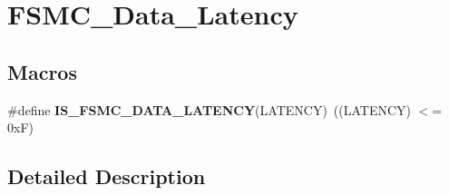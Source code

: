 \hypertarget{group___f_s_m_c___data___latency}{}\section{F\+S\+M\+C\+\_\+\+Data\+\_\+\+Latency}
\label{group___f_s_m_c___data___latency}
\subsection*{Macros}
\begin{DoxyCompactItemize}
\item 
\hypertarget{group___f_s_m_c___data___latency_ga1ab8659a9631d8bb4f57d8be8580155c}{}\#define {\bfseries I\+S\+\_\+\+F\+S\+M\+C\+\_\+\+D\+A\+T\+A\+\_\+\+L\+A\+T\+E\+N\+C\+Y}(L\+A\+T\+E\+N\+C\+Y)~((L\+A\+T\+E\+N\+C\+Y) $<$= 0x\+F)\label{group___f_s_m_c___data___latency_ga1ab8659a9631d8bb4f57d8be8580155c}

\end{DoxyCompactItemize}


\subsection{Detailed Description}
